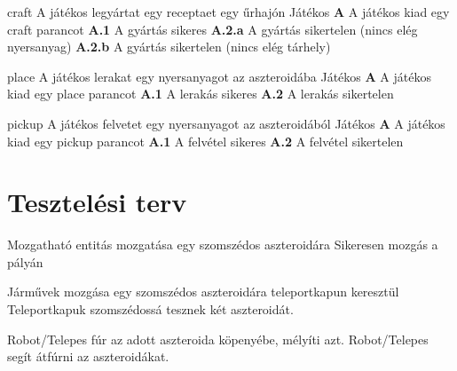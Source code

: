 \documentclass[../../projlab]{subfiles}
\begin{document}
\begin{use-case}
    {craft}
    {A játékos legyártat egy receptaet egy űrhajón}
    {Játékos} 
    \textbf{A} A játékos kiad egy craft parancot \newline
    \textbf{A.1} A gyártás sikeres \newline
    \textbf{A.2.a} A gyártás sikertelen (nincs elég nyersanyag)
    \textbf{A.2.b} A gyártás sikertelen (nincs elég tárhely)
\end{use-case}

\begin{use-case}
    {place}
    {A játékos lerakat egy nyersanyagot az aszteroidába}
    {Játékos} 
    \textbf{A} A játékos kiad egy place parancot \newline
    \textbf{A.1} A lerakás sikeres \newline
    \textbf{A.2} A lerakás sikertelen 
\end{use-case}

\begin{use-case}
    {pickup}
    {A játékos felvetet egy nyersanyagot az aszteroidából}
    {Játékos} 
    \textbf{A} A játékos kiad egy pickup parancot \newline
    \textbf{A.1} A felvétel sikeres \newline
    \textbf{A.2} A felvétel sikertelen 
\end{use-case}


\section{Tesztelési terv}

{Mozgatható entitás mozgatása egy szomszédos aszteroidára}
{Sikeresen mozgás a pályán}

{Járművek mozgása egy szomszédos aszteroidára teleportkapun keresztül}
{Teleportkapuk szomszédossá tesznek két aszteroidát.}

{Robot/Telepes fúr az adott aszteroida köpenyébe, mélyíti azt.}
{Robot/Telepes segít átfúrni az aszteroidákat.}
\end{document}
